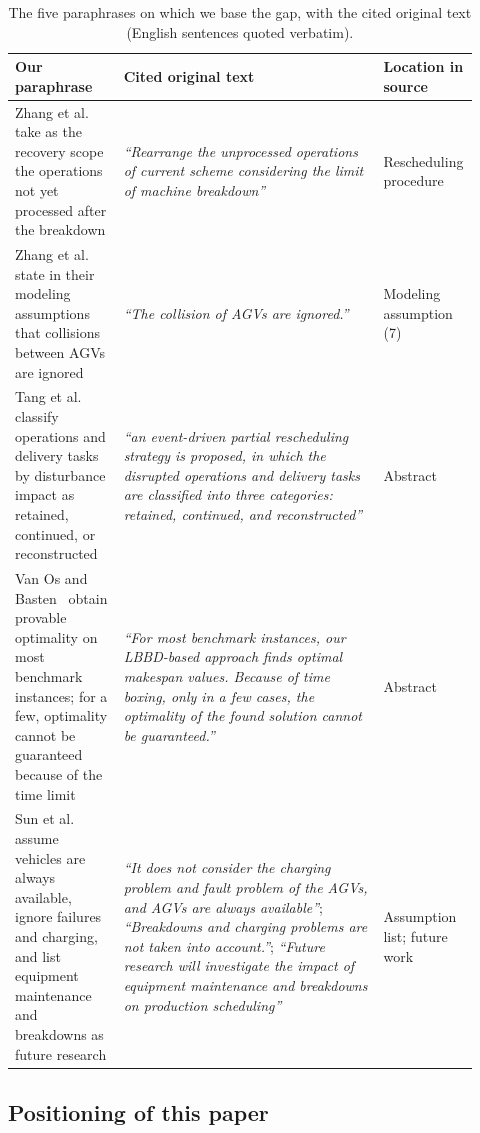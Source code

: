 \begin{table}[t]
\centering
\caption{The five paraphrases on which we base the gap, with the cited original text (English sentences quoted verbatim).}
\label{tab:refcheck}
\footnotesize
\begin{tabular}{@{}p{0.23\linewidth}p{0.55\linewidth}p{0.14\linewidth}@{}}
\toprule
\textbf{Our paraphrase} & \textbf{Cited original text} & \textbf{Location in source} \\
\midrule
Zhang et al.~\cite{zhang2023energy} take as the recovery scope the operations not yet processed after the breakdown &
\emph{``Rearrange the unprocessed operations of current scheme considering the limit of
machine breakdown''} &
Rescheduling procedure \\
\addlinespace
Zhang et al.~\cite{zhang2023energy} state in their modeling assumptions that collisions between AGVs are ignored &
\emph{``The collision of AGVs are ignored.''} &
Modeling assumption (7) \\
\addlinespace
Tang et al.~\cite{tang2026dynamic} classify operations and delivery tasks by disturbance impact as retained, continued, or reconstructed &
\emph{``an event-driven partial rescheduling strategy is proposed, in which the disrupted
operations and delivery tasks are classified into three categories: retained, continued,
and reconstructed''} &
Abstract \\
\addlinespace
Van Os and Basten~\cite{vanos2026exact} obtain provable optimality on most benchmark instances;
for a few, optimality cannot be guaranteed because of the time limit &
\emph{``For most benchmark instances, our LBBD-based approach finds optimal makespan
values. Because of time boxing, only in a few cases, the optimality of the found solution
cannot be guaranteed.''} &
Abstract \\
\addlinespace
Sun et al.~\cite{sun2023integrated} assume vehicles are always available, ignore failures and charging,
and list equipment maintenance and breakdowns as future research &
\emph{``It does not consider the charging problem and fault problem of the AGVs, and AGVs
are always available''}; \emph{``Breakdowns and charging problems are not taken into
account.''}; \emph{``Future research will investigate the impact of equipment maintenance
and breakdowns on production scheduling''} &
Assumption list; future work \\
\bottomrule
\end{tabular}
\end{table}

\subsection{Positioning of this paper}
\label{sec:rw_claim}

